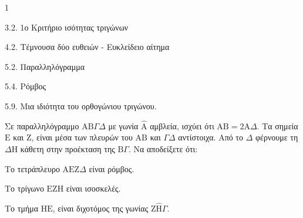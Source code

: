 \begin{ylh}{1}
    \item 3.2. 1ο Κριτήριο ισότητας τριγώνων
    \item 4.2. Τέμνουσα δύο ευθειών - Ευκλείδειο αίτημα
    \item 5.2. Παραλληλόγραμμα
    \item 5.4. Ρόμβος
    \item 5.9. Μια ιδιότητα του ορθογώνιου τριγώνου.
\end{ylh}
Σε παραλληλόγραμμο $\mathrm{A}\mathrm{B}\Gamma\Delta$ με γωνία $\hat{\mathrm{A}}$ αμβλεία, ισχύει ότι $\mathrm{A}\mathrm{B} = 2\mathrm{A}\Delta$. Τα σημεία $\mathrm{E}$ και $\mathrm{Z}$, είναι μέσα των πλευρών του $\mathrm{A}\mathrm{B}$ και $\Gamma\Delta$ αντίστοιχα. Από το $\Delta$ φέρνουμε τη $\Delta\mathrm{H}$ κάθετη στην προέκταση της $\mathrm{B}\Gamma$.
Να αποδείξετε ότι:
\begin{alist}
    \item Το τετράπλευρο $\mathrm{A}\mathrm{E}\mathrm{Z}\Delta$ είναι ρόμβος. 
    \item Το τρίγωνο $\mathrm{E}\mathrm{Z}\mathrm{H}$ είναι ισοσκελές. 
    \item Το τμήμα $\mathrm{H}\mathrm{E}$, είναι διχοτόμος της γωνίας $\mathrm{Z}\hat{\mathrm{H}}\Gamma$. 
\end{alist}
